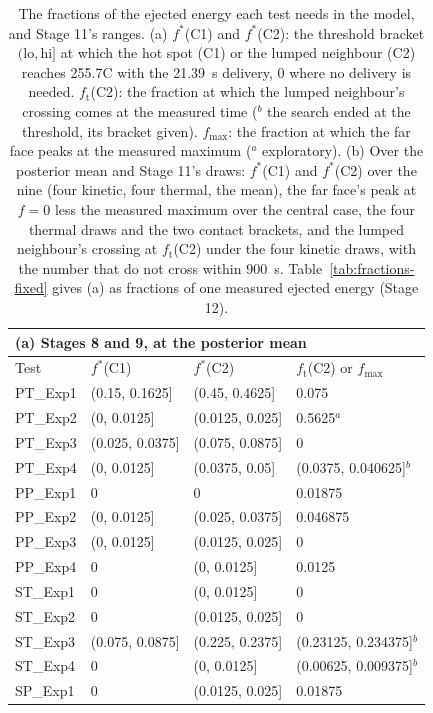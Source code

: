 \begin{table}[p]
\centering
\scriptsize
\caption{The fractions of the ejected energy each test needs in the model, and Stage 11's ranges. (a) $f^*$(C1) and $f^*$(C2): the threshold bracket $(\mathrm{lo},\mathrm{hi}]$ at which the hot spot (C1) or the lumped neighbour (C2) reaches 255.7\textdegree C with the 21.39~s delivery, 0 where no delivery is needed. $f_\mathrm{t}$(C2): the fraction at which the lumped neighbour's crossing comes at the measured time ($^{b}$ the search ended at the threshold, its bracket given). $f_\mathrm{max}$: the fraction at which the far face peaks at the measured maximum ($^{a}$ exploratory). (b) Over the posterior mean and Stage 11's draws: $f^*$(C1) and $f^*$(C2) over the nine (four kinetic, four thermal, the mean), the far face's peak at $f=0$ less the measured maximum over the central case, the four thermal draws and the two contact brackets, and the lumped neighbour's crossing at $f_\mathrm{t}$(C2) under the four kinetic draws, with the number that do not cross within 900~s. Table~\ref{tab:fractions-fixed} gives (a) as fractions of one measured ejected energy (Stage 12).}
\label{tab:fractions}
\begin{tabular}{llll}
\multicolumn{4}{l}{(a) Stages 8 and 9, at the posterior mean} \\
\toprule
Test & $f^*$(C1) & $f^*$(C2) & $f_\mathrm{t}$(C2) or $f_\mathrm{max}$ \\
\midrule
PT\_Exp1 & (0.15, 0.1625] & (0.45, 0.4625] & 0.075 \\
PT\_Exp2 & (0, 0.0125] & (0.0125, 0.025] & 0.5625$^{a}$ \\
PT\_Exp3 & (0.025, 0.0375] & (0.075, 0.0875] & 0 \\
PT\_Exp4 & (0, 0.0125] & (0.0375, 0.05] & (0.0375, 0.040625]$^{b}$ \\
PP\_Exp1 & 0 & 0 & 0.01875 \\
PP\_Exp2 & (0, 0.0125] & (0.025, 0.0375] & 0.046875 \\
PP\_Exp3 & (0, 0.0125] & (0.0125, 0.025] & 0 \\
PP\_Exp4 & 0 & (0, 0.0125] & 0.0125 \\
ST\_Exp1 & 0 & (0, 0.0125] & 0 \\
ST\_Exp2 & 0 & (0.0125, 0.025] & 0 \\
ST\_Exp3 & (0.075, 0.0875] & (0.225, 0.2375] & (0.23125, 0.234375]$^{b}$ \\
ST\_Exp4 & 0 & (0, 0.0125] & (0.00625, 0.009375]$^{b}$ \\
SP\_Exp1 & 0 & (0.0125, 0.025] & 0.01875 \\

\end{tabular}
\end{table}
